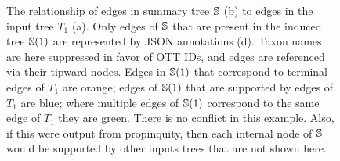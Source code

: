 \documentclass[fleqn,12pt,lineno,english]{wlpeerj}
\begin{document}
\begin{figure}
\hfill{}\hfill{}

\bigskip{}

\bigskip{}

\hfill{}\hfill{}

\caption{\label{fig:displayed-annotations}The relationship of edges in summary
tree $\protect\mathbb{S}$ (b) to edges in the input tree $T_{1}$
(a). Only edges of $\protect\mathbb{S}$ that are present in the
induced tree $\protect\mathbb{S}(1)$ are represented by JSON annotations
(d). Taxon names are here suppressed in favor of OTT IDs, and edges
are referenced via their tipward nodes. Edges in $\protect\mathbb{S}(1)$
that correspond to terminal edges of $T_{1}$ are orange; edges of
$\protect\mathbb{S}(1)$ that are supported by edges of $T_{1}$
are blue; where multiple edges of $\protect\mathbb{S}(1)$ correspond
to the same edge of $T_{1}$ they are green. There is no conflict
in this example. Also, if this were output from propinquity, then
each internal node of $\protect\mathbb{S}$ would be supported by
other inputs trees that are not shown here. }
\end{figure}
\end{document}
